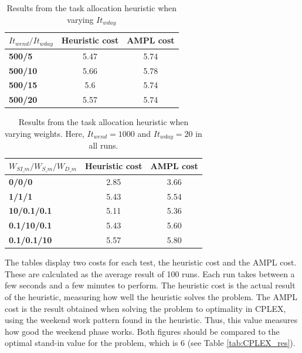 \begin{table}[!h]
\centering
\caption{Results from the task allocation heuristic when varying $It_{wday}$}
\label{tab:taskdist_res_wdayit}
\begin{tabular}{|l|l|l|}
\hline
\rowcolor{Gray} \textbf{$It_{wend}/It_{wday}$} &  \textbf{Heuristic cost} &  \textbf{AMPL cost} \\ \hline
\cellcolor{Gray} \textbf{500/5} & \multicolumn{1}{c|}{5.47} & \multicolumn{1}{c|}{5.74} \\
\cellcolor{Gray} \textbf{500/10} & \multicolumn{1}{c|}{5.66} & \multicolumn{1}{c|}{5.78} \\
\cellcolor{Gray} \textbf{500/15} & \multicolumn{1}{c|}{5.6} & \multicolumn{1}{c|}{5.74} \\
\cellcolor{Gray} \textbf{500/20} & \multicolumn{1}{c|}{5.57} & \multicolumn{1}{c|}{5.74} \\
\hline
\end{tabular}
\end{table}


\begin{table}[!h]
\centering
\caption{Results from the task allocation heuristic when varying weights. Here, $It_{wend} = 1000$ and $It_{wday} = 20$ in all runs.}
\label{tab:taskdist_weights_res}
\begin{tabular}{|l|l|l|}
\hline
\rowcolor{Gray} \textbf{$W_{SI\_m}/W_{S\_m}/W_{D\_m}$} & \textbf{Heuristic cost} &  \textbf{AMPL cost} \\ \hline
\cellcolor{Gray} \textbf{0/0/0 }& \multicolumn{1}{c|}{2.85} & \multicolumn{1}{c|}{3.66}  \\
\cellcolor{Gray} \textbf{1/1/1} & \multicolumn{1}{c|}{5.43} & \multicolumn{1}{c|}{5.54}  \\
\cellcolor{Gray} \textbf{10/0.1/0.1} & \multicolumn{1}{c|}{5.11} & \multicolumn{1}{c|}{5.36}  \\
\cellcolor{Gray} \textbf{0.1/10/0.1} & \multicolumn{1}{c|}{5.43} & \multicolumn{1}{c|}{5.60}  \\
\cellcolor{Gray} \textbf{0.1/0.1/10} & \multicolumn{1}{c|}{5.57} & \multicolumn{1}{c|}{5.80} \\
\hline
\end{tabular}
\end{table}

The tables display two costs for each test, the heuristic cost and the AMPL cost. These are calculated as the average result of 100 runs. Each run takes between a few seconds and a few minutes to perform. The heuristic cost is the actual result of the heuristic, measuring how well the heuristic solves the problem. The AMPL cost is the result obtained when solving the problem to optimality in CPLEX, using the weekend work pattern found in the heuristic. Thus, this value measures how good the weekend phase works. Both figures should be compared to the optimal stand-in value for the problem, which is 6 (see Table \ref{tab:CPLEX_res}).

